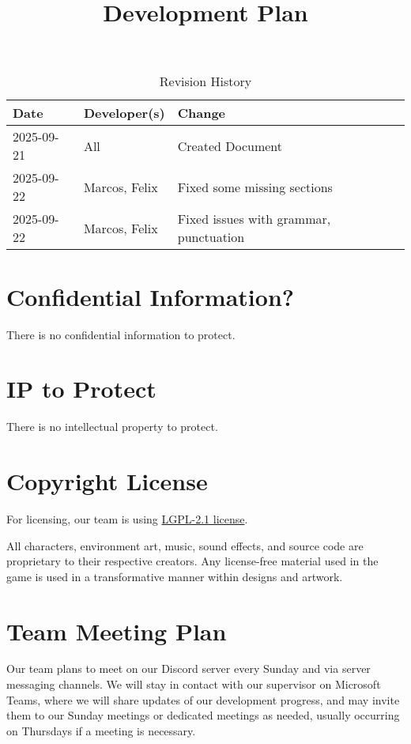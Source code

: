 \documentclass{article}
\title{Development Plan\\\progname}
\author{\authname}
\date{}
\begin{document}
\maketitle

\begin{table}[hp]
\caption{Revision History} \label{TblRevisionHistory}
\begin{tabularx}{\textwidth}{llX}
\toprule
\textbf{Date} & \textbf{Developer(s)} & \textbf{Change}\\
\midrule
2025-09-21 & All & Created Document\\
2025-09-22 & Marcos, Felix & Fixed some missing sections\\
2025-09-22 & Marcos, Felix & Fixed issues with grammar, punctuation\\
\bottomrule
\end{tabularx}
\end{table}

\newpage{}

\tableofcontents

\section{Confidential Information?}

There is no confidential information to protect.

\section{IP to Protect}

There is no intellectual property to protect.

\section{Copyright License}

For licensing, our team is using \href{https://github.com/felix-hurst/Ad-Natura/blob/main/LICENSE}{LGPL-2.1 license}.

All characters, environment art, music, sound effects, and source code are proprietary to their respective creators. Any license-free material used in the game is used in a transformative manner within designs and artwork.

\section{Team Meeting Plan}


Our team plans to meet on our Discord server every Sunday and via server messaging channels. We will stay in contact with our supervisor on Microsoft Teams, where we will share updates of our development progress, and may invite them to our Sunday meetings or dedicated meetings as needed, usually occurring on Thursdays if a meeting is necessary. \\
\end{document}
